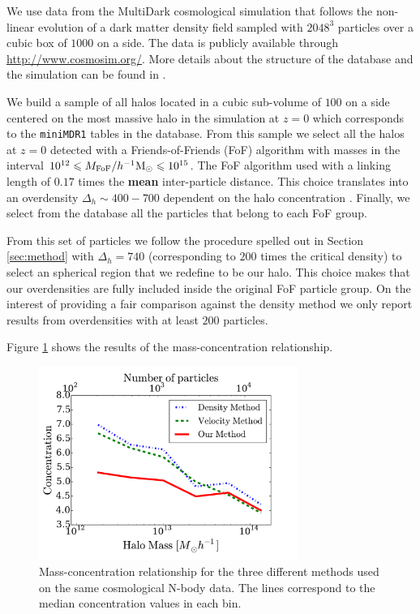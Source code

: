 \documentclass[a4,useAMS,usenatbib,usegraphicx]{mn2e}
\newcommand{\hMpc}{{\ifmmode{h^{-1}{\rm Mpc}}\else{$h^{-1}$Mpc}\fi}}
\newcommand{\hMsun}{{\ifmmode{h^{-1}{\rm {M_{\odot}}}}\else{$h^{-1}{\rm{M_{\odot}}}$}\fi}}
\begin{document}
We use data from the MultiDark cosmological simulation that follows
the non-linear evolution of a dark matter density field sampled with
$2048^3$ particles over a cubic box of $1000$ \hMpc on a side.  The
data is publicly available through \url{http://www.cosmosim.org/}.
More details about the structure of the database and the simulation
can be found in \citep{2013AN....334..691R}.

We build a sample of all halos located in a cubic sub-volume of $100$
\hMpc on a side centered on the most massive halo in the simulation at
$z=0$ which corresponds to the \texttt{miniMDR1} tables in the
database.  From this sample we select all the halos at $z=0$ detected
with a Friends-of-Friends (FoF) algorithm with masses in the interval
$10^{12}\leq M_{\rm FoF}/\hMsun \leq 10^{15}$.  The FoF algorithm used
with a linking length of $0.17$ times the {\bf mean} inter-particle
distance. This choice translates into an overdensity $\Delta_h\sim
400-700$ dependent on the halo concentration \citep{More2011}.
Finally, we select from the database all the particles that belong to
each FoF group.

From this set of particles we follow the procedure spelled out in
Section \ref{sec:method} with $\Delta_h=740$ (corresponding to $200$
times the critical density) to select an spherical region that we
redefine to be our halo.  This choice makes that our overdensities are
fully included inside the original FoF particle group.  On the
interest of providing a fair comparison against the density method we
only report results from overdensities with at least $200$ particles.

Figure \ref{fig:concentration} shows the results of the
mass-concentration relationship.

\begin{figure}
\begin{center}
  \includegraphics[width=0.75\textwidth]{concentration.pdf}
\end{center}
\caption{Mass-concentration relationship for the three different
  methods used on the same cosmological N-body data. 
  The lines correspond to the median concentration values in each bin.
  \label{fig:concentration}}
\end{figure}
\end{document}
